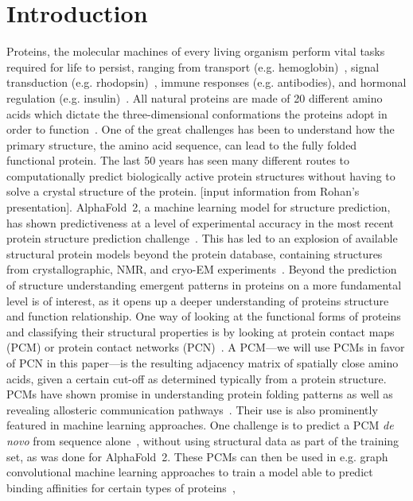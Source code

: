 \documentclass[
reprint,
twocolumn,
amsmath,amssymb,superscriptaddress,aps,
pre]{revtex4-1}
\begin{document}
\section{Introduction}
Proteins, the molecular machines of every living organism perform vital tasks required for life to persist, ranging from transport (e.g. hemoglobin)~\cite{ahmed2020hemoglobin}, signal transduction (e.g. rhodopsin)~\cite{nagata2021rhodopsins}, immune responses (e.g. antibodies), and hormonal regulation (e.g. insulin)~\cite{dill2008protein,Dill1042}. All natural proteins are made of 20 different amino acids which dictate the three-dimensional conformations the proteins adopt in order to function~\cite{scheraga2007proteinfolding}. One of the great challenges has been to understand how the primary structure, the amino acid sequence, can lead to the fully folded functional protein. The last 50 years has seen many different routes to computationally predict biologically active protein structures without having to solve a crystal structure of the protein. [input information from Rohan's presentation]. AlphaFold~2, a machine learning model for structure prediction, has shown predictiveness at a level of experimental accuracy in the most recent protein structure prediction challenge~\cite{jumper2021highly, kryshtafovych2021critical}. This has led to an explosion of available structural protein models beyond the protein database, containing structures from crystallographic, NMR, and cryo-EM experiments~\cite{berman2000protein}. Beyond the prediction of structure understanding emergent patterns in proteins on a more fundamental level is of interest, as it opens up a deeper understanding of proteins structure and function relationship.  One way of looking at the functional forms of proteins and classifying their structural properties is by looking at protein contact maps (PCM) or protein contact networks (PCN)~\cite{Vendruscolo2002,dipaola2013protein,Estrada2011}. A PCM---we will use PCMs in favor of PCN in this paper---is the resulting adjacency matrix of spatially close amino acids, given a certain cut-off as determined typically from a protein structure. PCMs have shown promise in understanding protein folding patterns as well as revealing allosteric communication pathways~\cite{yao2019establishing, menichetti2016network,dokholyan2002topological}. Their use is also prominently featured in machine learning approaches. One challenge is to predict a PCM \textit{de novo} from sequence alone~\cite{bassot2019using, rives2021biological, rao2021msa}, without using structural data as part of the training set, as was done for AlphaFold~2. These PCMs can then be used in e.g. graph convolutional machine learning approaches to train a model able to predict binding affinities for certain types of proteins~\cite{jiang2020drug},
\end{document}
